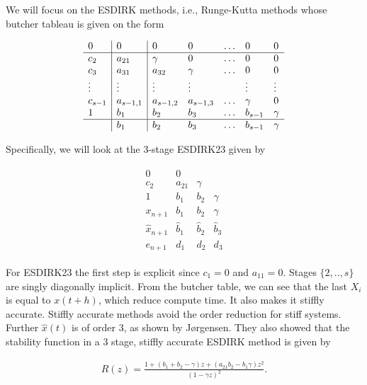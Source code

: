 We will focus on the ESDIRK methods, i.e., Runge-Kutta methods whose butcher tableau is given on the form

\begin{align}
    \begin{array}{l|l|lllll}
0 & 0 & 0 & 0 & \ldots & 0 & 0 \\
\hline c_{2} & a_{21} & \gamma & 0 & \ldots & 0 & 0 \\
c_{3} & a_{31} & a_{32} & \gamma & \ldots & 0 & 0 \\
\vdots & \vdots & \vdots & \vdots & & \vdots & \vdots \\
c_{s-1} & a_{s-1,1} & a_{s-1,2} & a_{s-1,3} & \ldots & \gamma & 0 \\
1 & b_{1} & b_{2} & b_{3} & \ldots & b_{s-1} & \gamma \\
\hline & b_{1} & b_{2} & b_{3} & \ldots & b_{s-1} & \gamma
\end{array}
\end{align}

Specifically, we will look at the 3-stage ESDIRK23 given by

\begin{align}
    \begin{array}{c|ccc}
0 & 0 & & \\
c_{2} & a_{21} & \gamma & \\
1 & b_{1} & b_{2} & \gamma \\
\hline x_{n+1} & b_{1} & b_{2} & \gamma \\
\hat{x}_{n+1} & \hat{b}_{1} & \hat{b}_{2} & \hat{b}_{3} \\
\hline e_{n+1} & d_{1} & d_{2} & d_{3}
\end{array}
\end{align}

For ESDIRK23 the first step is explicit since $c_1 = 0$ and $a_{11} = 0$. Stages $\{2, .., s\}$ are singly diagonally implicit. From the butcher table, we can see that the last $X_i$ is equal to $x(t+h)$, which reduce compute time. It also makes it stiffly accurate. Stiffly accurate
methods avoid the order reduction for stiff systems. Further $\hat x(t)$ is of order 3, as shown by Jørgensen\cite{dotdot2018}. They also showed that the stability function in a 3 stage, stiffly accurate ESDIRK method is given by

\begin{align}
    R(z)=\frac{1+\left(b_{1}+b_{2}-\gamma\right) z+\left(a_{21} b_{2}-b_{1} \gamma\right) z^{2}}{(1-\gamma z)^{2}}.
\end{align}

